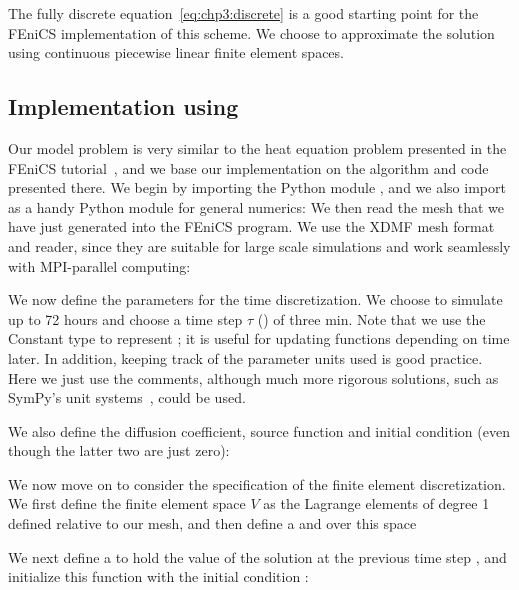 The fully discrete equation~\eqref{eq:chp3:discrete} is a good
starting point for the FEniCS implementation of this scheme. We choose
to approximate the solution using continuous piecewise linear finite
element spaces. 

\subsection{Implementation using {\fenics}}
\label{sec:chp3:fenics-code-implementation}

Our model problem is very similar to the heat equation problem
presented in the FEniCS tutorial~\cite[Chapter
  3.1]{langtangen2016solving}, and we base our implementation on the
algorithm and code presented there. We begin by importing the Python
module , and we also import 
as a handy Python module for general numerics:
%
%
\noindent We then read the mesh that we have just generated into the FEniCS
program. We use the XDMF mesh format and reader, since they are suitable for
large scale simulations and work seamlessly with MPI-parallel computing:

\noindent We now define the parameters for the time discretization. We
choose to simulate up to 72 hours and choose a time step $\tau$
() of three min. Note that we use the Constant type to
represent ; it is useful for updating functions
depending on time later. In addition, keeping track of the parameter units
used is good practice. Here we just use the comments, although much more
rigorous solutions, such as SymPy's unit
systems~\cite{meurer2017sympy}, could be used.

\noindent We also define the diffusion coefficient, source function
and initial condition (even though the latter two are just zero):

We now move on to consider the specification of the finite element
discretization. We first define the finite element space $V$ as the
Lagrange elements of degree 1 defined relative to our mesh, and then
define a  and 
over this space 

\noindent We next define a  to hold the value
of the solution at the previous time step , and
initialize this function with the initial condition :

